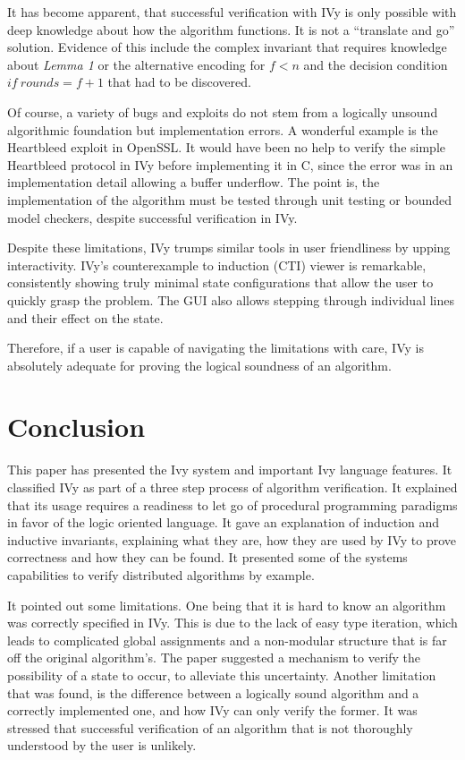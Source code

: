 \documentclass[fleqn]{article}
\begin{document}
It has become apparent, that successful verification with IVy is only possible with deep knowledge about how the algorithm functions. It is not a ``translate and go'' solution.
Evidence of this include the complex invariant that requires knowledge about \textit{Lemma 1} or the alternative encoding for $f<n$ and the decision condition $if\ rounds = f+1$ that had to be discovered.

Of course, a variety of bugs and exploits do not stem from a logically unsound algorithmic foundation but implementation errors. A wonderful example is the Heartbleed exploit in OpenSSL. It would have been no help to verify the simple Heartbleed protocol in IVy before implementing it in C, since the error was in an implementation detail allowing a buffer underflow. The point is, the implementation of the algorithm must be tested through unit testing or bounded model checkers, despite successful verification in IVy.

Despite these limitations, IVy trumps similar tools in user friendliness by upping interactivity. \cite{ivy}
IVy's counterexample to induction (CTI) viewer is remarkable, consistently showing truly minimal
state configurations that allow the user to quickly grasp the problem. The GUI also allows stepping
through individual lines and their effect on the state.

Therefore, if a user is capable of navigating the limitations with care, IVy is absolutely adequate for proving the logical soundness of
an algorithm.


\section{Conclusion}
This paper has presented the Ivy system and important Ivy language features. It classified IVy
as part of a three step process of algorithm verification.
It explained that its usage requires a readiness to let go of procedural programming paradigms
in favor of the logic oriented language. It gave an explanation of induction and inductive invariants,
explaining what they are, how they are used by IVy to prove correctness and how they can be found.
It presented some of the systems capabilities to verify distributed algorithms by example.

It pointed out some limitations. One being that it is hard to know an algorithm was correctly specified in IVy. This is due to
the lack of easy type iteration, which leads to complicated global assignments and a non-modular structure that is far off
the original algorithm's.
The paper suggested a mechanism to verify the possibility of a state to occur, to alleviate this uncertainty.
Another limitation that was found, is the difference between a logically sound algorithm and a correctly implemented one, and how IVy can only verify the former.
It was stressed that successful verification of an algorithm that is not thoroughly understood by the user is unlikely.
\end{document}
